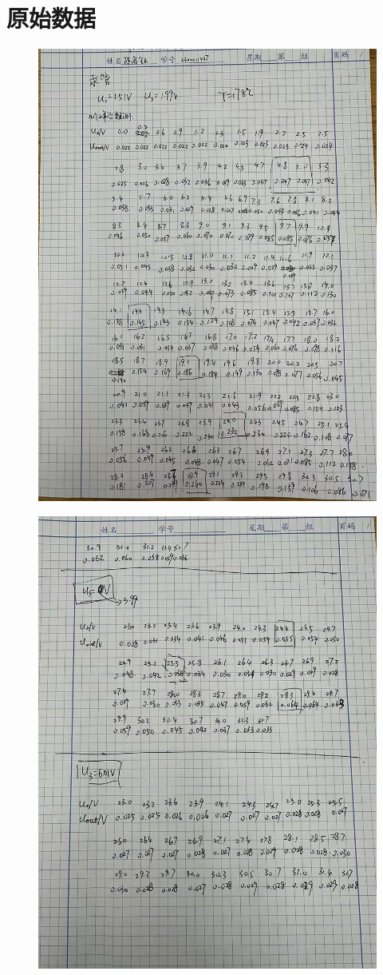 \documentclass{ctexart}
\begin{document}
	\section{原始数据}
	\begin{figure}[H]
		\centering
		\includegraphics[width=0.6\linewidth,angle=270]{data1.jpg}
	\end{figure}
	\begin{figure}[H]
		\centering
		\includegraphics[width=0.6\linewidth,angle=270]{data2.jpg}
	\end{figure}
\end{document}
